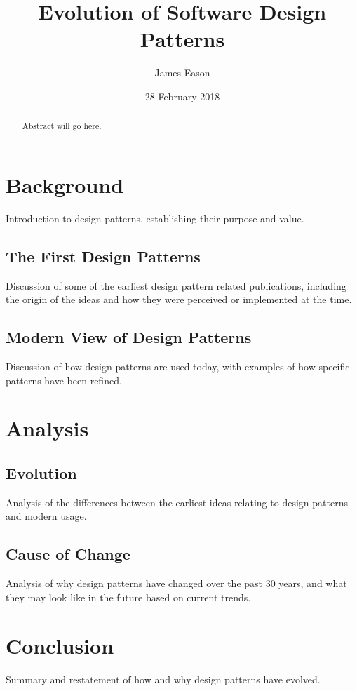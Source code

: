 \documentclass[11pt]{article}
\title{Evolution of Software Design Patterns}
\author{James Eason}
\date{28 February 2018}
\begin{document}
\maketitle

\thispagestyle{empty}

\begin{abstract}
  Abstract will go here.
\end{abstract}

\section{Background}

Introduction to design patterns, establishing their purpose and value.

\subsection{The First Design Patterns}
Discussion of some of the earliest design pattern related publications, including the origin of the ideas and how they were perceived or implemented at the time. 

\subsection{Modern View of Design Patterns}
Discussion of how design patterns are used today, with examples of how specific patterns have been refined.

\section{Analysis}

\subsection{Evolution}
Analysis of the differences between the earliest ideas relating to design patterns and modern usage.

\subsection{Cause of Change}
Analysis of why design patterns have changed over the past 30 years, and what they may look like in the future based on current trends.

\section{Conclusion}
Summary and restatement of how and why design patterns have evolved.

\nocite{seffah2010, agerbo1998, erl2009, alexander1999, beck1987}



\end{document}
